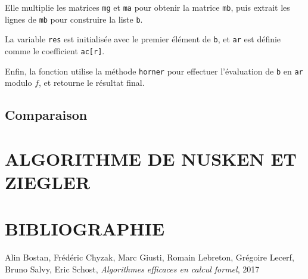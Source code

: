 \documentclass[a4paper]{article}
\begin{document}
Elle multiplie les matrices \texttt{mg} et \texttt{ma} pour obtenir la matrice \texttt{mb}, puis extrait les lignes de \texttt{mb} pour construire la liste \texttt{b}.

La variable \texttt{res} est initialisée avec le premier élément de \texttt{b}, et \texttt{ar} est définie comme le coefficient \texttt{ac[r]}.

Enfin, la fonction utilise la méthode \texttt{horner} pour effectuer l'évaluation de \texttt{b} en \texttt{ar} modulo $f$, et retourne le résultat final.


\subsection{Comparaison}


\section{ALGORITHME DE NUSKEN ET ZIEGLER}



\newpage
\section{BIBLIOGRAPHIE}

\begin{thebibliography}{10}
     Alin Bostan, Frédéric Chyzak, Marc Giusti, Romain Lebreton, Grégoire Lecerf, Bruno Salvy, Eric Schost,
    \emph{Algorithmes efficaces en calcul formel}, 2017

\end{thebibliography}
\end{document}
